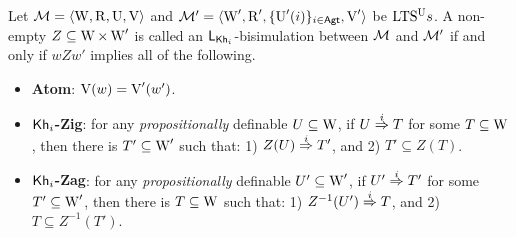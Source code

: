 \begin{definition}\label{def:bisim-khi}
Let $\mathcal{M} = \langle \operatorname{W},\operatorname{R},\operatorname{U},\operatorname{V} \rangle$ and $\mathcal{M}' = \langle \operatorname{W}',\operatorname{R}',\{ \operatorname{U}'(i) \}_{i\in{\rm \sf Agt}},\operatorname{V}' \rangle$ be ${\textup{LTS$^\text{\textup{U}}$}}s$.
%
A non-empty $Z \subseteq \operatorname{W} \times \operatorname{W}'$ is called an $\mathsf{L}_{{\sf Kh}_i}$-bisimulation between $\mathcal{M}$ and $\mathcal{M}'$ if and only if $wZw'$ implies all of the following.
\begin{itemize} 
    \item \textbf{Atom}: $\operatorname{V}(w)=\operatorname{V}'(w')$.

    \item \textbf{${\sf Kh}_i$-Zig}: for any \emph{propositionally} definable $U \subseteq \operatorname{W}$, if $U \stackrel{i}{\Rightarrow} T$ for some $T \subseteq \operatorname{W}$, then there is $T' \subseteq \operatorname{W}'$ such that: 
        1) $Z(U) \stackrel{i}{\Rightarrow} T'$, and
        2) $T' \subseteq Z(T)$.

    \item \textbf{${\sf Kh}_i$-Zag}: %
    for any \emph{propositionally} definable $U' \subseteq \operatorname{W}'$, if $U' \stackrel{i}{\Rightarrow} T'$ for some $T' \subseteq \operatorname{W}'$, then there is $T \subseteq \operatorname{W}$ such that: 
        1) $Z^{-1}(U') \stackrel{i}{\Rightarrow} T$, and
        2) $T \subseteq Z^{-1}(T')$.


\end{itemize}
\end{definition}
